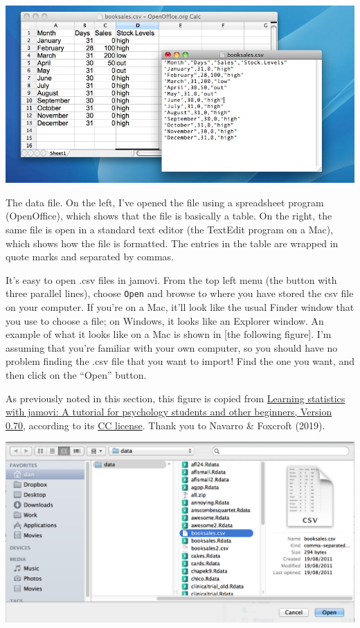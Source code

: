 \documentclass[
]{book}
\begin{document}
\includegraphics[width=0.75\linewidth]{img/booksalescsv}

\caption{The  data file. On the left, I've opened the file using a spreadsheet program (OpenOffice), which shows that the file is basically a table. On the right, the same file is open in a standard text editor (the TextEdit program on a Mac), which shows how the file is formatted. The entries in the table are wrapped in quote marks and separated by commas.}

It's easy to open .csv files in jamovi. From the top left menu (the button with three parallel lines), choose \texttt{Open} and browse to where you have stored the csv file on your computer. If you're on a Mac, it'll look like the usual Finder window that you use to choose a file; on Windows, it looks like an Explorer window. An example of what it looks like on a Mac is shown in {[}the following figure{]}. I'm assuming that you're familiar with your own computer, so you should have no problem finding the .csv file that you want to import! Find the one you want, and then click on the ``Open'' button.

As previously noted in this section, this figure is copied from \href{https://www.learnstatswithjamovi.com/}{Learning statistics with jamovi: A tutorial for psychology students and other beginners, Version 0.70}, according to its \href{https://creativecommons.org/licenses/by-sa/4.0/deed.ast}{CC license}. Thank you to Navarro \& Foxcroft (2019).

\includegraphics[width=0.75\linewidth]{img/openscreen}
\end{document}
